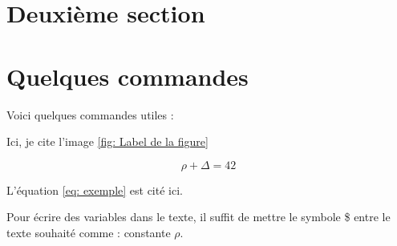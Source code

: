 \documentclass{rapportECL}
\begin{document}
\lipsum[3-4] %

\section{Deuxième section}

\lipsum[3-5] %


\section{Quelques commandes}

Voici quelques commandes utiles :


Ici, je cite l'image \ref{fig: Label de la figure}



\begin{equation} \label{eq: exemple}
\rho + \Delta = 42
\end{equation}

L'équation \ref{eq: exemple} est cité ici. 


Pour écrire des variables dans le texte, il suffit de mettre le symbole \$ entre le texte souhaité comme : constante $\rho$. 
\end{document}
